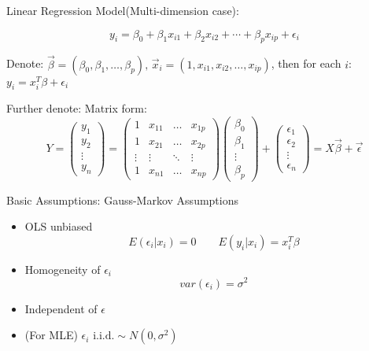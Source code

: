 \begin{point}
    Linear Regression Model(Multi-dimension case):
\end{point}

    
\[
    y_i=\beta_0+\beta_1x_{i1}+\beta_2x_{i2}+\cdots+\beta_px_{ip}+\epsilon_i    
\]

    Denote: $\vec{\beta}=(\beta_0,\beta_1,\ldots,\beta_p),\, \vec{x}_i=(1,x_{i1},x_{i2},\ldots,x_{ip})$, then for each $i$: $y_i=x_i^T\beta+\epsilon_i$

    Further denote: Matrix form:
    \[
        Y=\begin{pmatrix}
            y_1\\
            y_2\\
            \vdots\\
            y_n
        \end{pmatrix}  
        =
        \begin{pmatrix}
            1&x_{11}&\ldots&x_{1p}\\
            1&x_{21}&\ldots&x_{2p}\\
            \vdots&\vdots&\ddots&\vdots\\
            1&x_{n1}&\ldots&x_{np}
        \end{pmatrix}
        \begin{pmatrix}
            \beta_0\\
            \beta_1\\
            \vdots\\
            \beta_p
        \end{pmatrix}
        +
        \begin{pmatrix}
            \epsilon_1\\
            \epsilon_2\\
            \vdots\\
            \epsilon_n
        \end{pmatrix}
        =X\vec{\beta}+\vec{\epsilon}
    \]

    Basic Assumptions: Gauss-Markov Assumptions
    \begin{itemize}
        \item OLS unbiased\[E(\epsilon_i|x_i)=0\qquad E(y_i|x_i)=x_i^T\beta\]
        \item Homogeneity of $\epsilon_i$\[var(\epsilon_i)=\sigma^2\]
        \item Independent of $\epsilon$
        \item (For MLE) $\epsilon_i\text{ i.i.d.}\sim N(0,\sigma^2)$
    \end{itemize}

